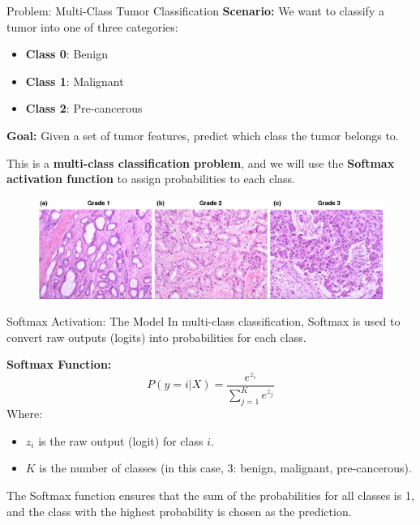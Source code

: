\documentclass[serif, aspectratio=169]{beamer}
\begin{document}
\begin{frame}{Problem: Multi-Class Tumor Classification}
    \textbf{Scenario:} We want to classify a tumor into one of three categories:
    \begin{itemize}
        \item \textbf{Class 0}: Benign
        \item \textbf{Class 1}: Malignant
        \item \textbf{Class 2}: Pre-cancerous
    \end{itemize}
    
    \textbf{Goal:} Given a set of tumor features, predict which class the tumor belongs to.
    
    This is a \textbf{multi-class classification problem}, and we will use the \textbf{Softmax activation function} to assign probabilities to each class.
    
            \begin{figure}
\centerline{\includegraphics[scale=.4]{pic/cancer.jpg}}

\label{fig}
\end{figure}
\end{frame}
\begin{frame}{Softmax Activation: The Model}
    In multi-class classification, Softmax is used to convert raw outputs (logits) into probabilities for each class.
    
    \textbf{Softmax Function:}
    \[
    P(y = i | X) = \frac{e^{z_i}}{\sum_{j=1}^{K} e^{z_j}}
    \]
    Where:
    \begin{itemize}
        \item \( z_i \) is the raw output (logit) for class \( i \).
        \item \( K \) is the number of classes (in this case, 3: benign, malignant, pre-cancerous).
    \end{itemize}
    
    The Softmax function ensures that the sum of the probabilities for all classes is 1, and the class with the highest probability is chosen as the prediction.
\end{frame}
\end{document}
